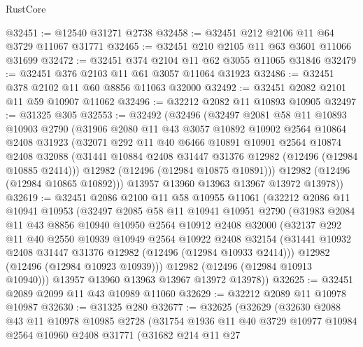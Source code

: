\begin{lexlean}{RustCore}
\begin{coremodule}
@32451 := @12540 @31271 @2738
@32458 := @32451 @212 @2106 @11 @64 @3729 @11067 @31771
@32465 := @32451 @210 @2105 @11 @63 @3601 @11066 @31699
@32472 := @32451 @374 @2104 @11 @62 @3055 @11065 @31846
@32479 := @32451 @376 @2103 @11 @61 @3057 @11064 @31923
@32486 := @32451 @378 @2102 @11 @60 @8856 @11063 @32000
@32492 := @32451 @2082 @2101 @11 @59 @10907 @11062
@32496 := @32212 @2082 @11 @10893 @10905
@32497 := @31325 @305
@32553 := @32492
    (@32496
      (@32497
        @2081
        @58
        @11
        @10893
        @10903
        @2790
        (@31906
          @2080
          @11
          @43
          @3057
          @10892
          @10902
          @2564
          @10864
          @2408
          @31923
          (@32071
            @292
            @11
            @40
            @6466
            @10891
            @10901
            @2564
            @10874
            @2408
            @32088
            (@31441 @10884 @2408 @31447 @31376 @12982 (@12496 (@12984 @10885 @2414)))
            @12982
            (@12496 (@12984 @10875 @10891)))
          @12982
          (@12496 (@12984 @10865 @10892)))
        @13957
        @13960
        @13963
        @13967
        @13972
        @13978))
@32619 := @32451
    @2086
    @2100
    @11
    @58
    @10955
    @11061
    (@32212
      @2086
      @11
      @10941
      @10953
      (@32497
        @2085
        @58
        @11
        @10941
        @10951
        @2790
        (@31983
          @2084
          @11
          @43
          @8856
          @10940
          @10950
          @2564
          @10912
          @2408
          @32000
          (@32137
            @292
            @11
            @40
            @2550
            @10939
            @10949
            @2564
            @10922
            @2408
            @32154
            (@31441 @10932 @2408 @31447 @31376 @12982 (@12496 (@12984 @10933 @2414)))
            @12982
            (@12496 (@12984 @10923 @10939)))
          @12982
          (@12496 (@12984 @10913 @10940)))
        @13957
        @13960
        @13963
        @13967
        @13972
        @13978))
@32625 := @32451 @2089 @2099 @11 @43 @10989 @11060
@32629 := @32212 @2089 @11 @10978 @10987
@32630 := @31325 @280
@32677 := @32625
    (@32629
      (@32630
        @2088
        @43
        @11
        @10978
        @10985
        @2728
        (@31754
          @1936
          @11
          @40
          @3729
          @10977
          @10984
          @2564
          @10960
          @2408
          @31771
          (@31682
            @214
            @11
            @27

\end{coremodule}
\end{lexlean}

